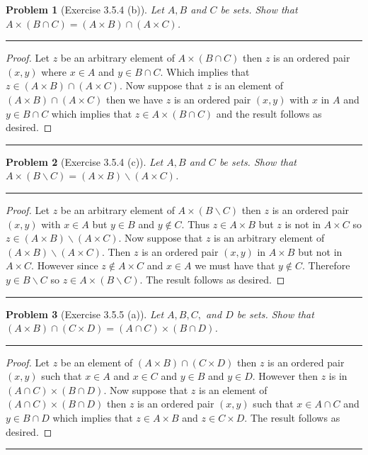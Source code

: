 \documentclass{article}
\newcommand{\lined}{\noindent\rule{\textwidth}{1pt}}
\newtheorem*{problem}{Problem}
\begin{document}
	\newpage
	
	\begin{problem}[Exercise 3.5.4 (b)]
		Let $A,B$ and $C$ be sets. Show that $A \times (B \cap C) = (A \times B) \cap (A \times C)$.
	\end{problem}
	
	\lined
	\begin{proof}
		Let $z$ be an arbitrary element of $A \times (B \cap C)$ then $z$ is an ordered pair $(x,y)$ where $x \in A$ and 
		$y \in B \cap C$. Which implies that $z \in (A \times B) \cap (A \times C)$. Now suppose that $z$ is an element of
		$(A \times B) \cap (A \times C)$ then we have $z$ is an ordered pair $(x,y)$ with $x$ in $A$ and $y \in B \cap C$ which implies that $z \in A \times (B \cap C)$ and the result follows as desired.
	\end{proof}
	\lined
	
	\newpage 
	
	\begin{problem}[Exercise 3.5.4 (c)]
		Let $A,B$ and $C$ be sets. Show that $A \times (B \backslash C) = (A \times B) \backslash (A \times C)$.
	\end{problem}

	\lined
	\begin{proof}
		Let $z$ be an arbitrary element of $A \times (B \backslash C)$ then $z$ is an ordered pair $(x,y)$ with $x \in A$ but
		$y \in B$ and $y \notin C$. Thus $z \in A \times B$ but $z$ is not in $A \times C$ so $z \in (A \times B) \backslash (A \times C)$.
		Now suppose that $z$ is an arbitrary element of $(A \times B) \backslash (A \times C)$. Then $z$ is an ordered pair $(x,y)$ in 
		$A \times B$ but not in $A \times C$. However since $z \notin A \times C$ and $x \in A$ we must have that $y \notin C$. 
		Therefore $y \in B \backslash C$ so $z \in A \times (B \backslash C)$. The result follows as desired.
	\end{proof}
	\lined
	
	\newpage
	
	\begin{problem}[Exercise 3.5.5 (a)]
		Let $A,B,C,$ and $D$ be sets. Show that $(A \times B) \cap (C \times D) = (A \cap C) \times (B \cap D)$.
	\end{problem}
	
	
	\lined
	\begin{proof}
		Let $z$ be an element of $(A \times B) \cap (C \times D)$ then $z$ is an ordered pair $(x,y)$ such that 
		$x \in A$ and $x \in C$ and $y \in B$ and $y \in D$. However then $z$ is in $(A \cap C) \times (B \cap D)$.  Now
		suppose that $z$ is an element of $(A \cap C) \times (B \cap D)$ then $z$ is an ordered pair $(x,y)$ such that $x \in A \cap C$
		and $y \in B \cap D$ which implies that $z \in A \times B$ and $z \in C \times D$. The result follows as desired.
	\end{proof}
	\lined
	
\end{document}
